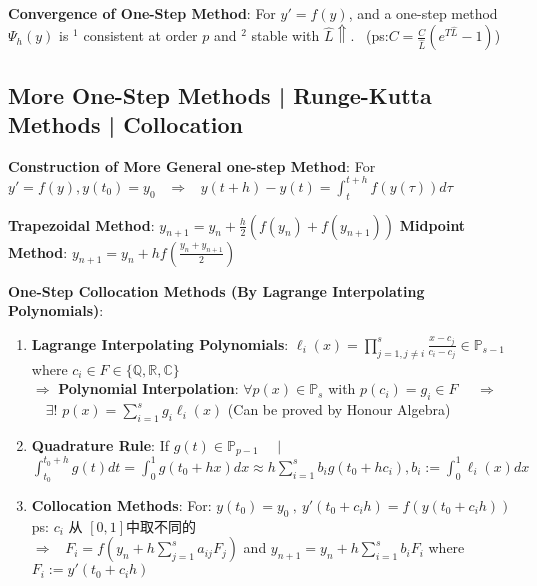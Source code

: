 \documentclass[9pt]{article}
\begin{document}
\vspace{-2pt}
\textbf{Convergence of One-Step Method}: {\small For $y'=f(y)$, and a one-step method $\Psi_h(y)$ is $^1$ consistent at order $p$ and $^2$ stable with $\widehat{L}\Uparrow$.} \ {\tiny (ps:$C=\frac{C}{\widehat{L}}(e^{T\widehat{L}}-1)$)}


\subsection{More One-Step Methods | Runge-Kutta Methods | Collocation} %

\textbf{Construction of More General one-step Method}: For $y'=f(y),y(t_0)=y_0$ \ $\Rightarrow$ \ $y(t+h)-y(t)=\int^{t+h}_tf(y(\tau))d\tau$

\textbf{Trapezoidal Method}: $y_{n+1}=y_n+\frac{h}{2}(f(y_n)+f(y_{n+1}))$ \quad \quad \textbf{Midpoint Method}: {\small $y_{n+1}=y_n+hf(\frac{y_n+y_{n+1}}{2})$}

\textbf{One-Step Collocation Methods (By Lagrange Interpolating Polynomials)}:

\begin{enumerate}[itemsep=-2pt, topsep=-2pt]
    \item \textbf{Lagrange Interpolating Polynomials}: $\ell_{i}(x)=\prod_{j=1,j\ne i}^{s}\frac{x-c_j}{c_i-c_j}\in\mathbb{P}_{s-1}$ \quad where $c_i\in F\in\{\mathbb{Q},\mathbb{R},\mathbb{C}\}$ \\
    $\Rightarrow$ \textbf{Polynomial Interpolation}: $\forall p(x)\in \mathbb{P}_s$ with $p(c_i)=g_i\in F$ \ \ $\Rightarrow$ \ \ $\exists!$ $p(x)=\sum_{i=1}^{s}g_i\ell_i(x)$ {\tiny (Can be proved by Honour Algebra)}
    \item \textbf{Quadrature Rule}: {\small If $g(t)\in\mathbb{P}_{p-1}$} \ \ $\big|$ \ \ {\small $\int^{t_0+h}_{t_0}g(t)dt=\int^1_0g(t_0+hx)dx\approx h\sum_{i=1}^{s}b_ig(t_0+hc_i),b_i:=\int^1_0\ell_i(x)dx$} 
    \item \textbf{Collocation Methods}: For: $y(t_0)=y_0 \ , \ y'(t_0+c_ih)=f(y(t_0+c_ih))$ {\tiny ps: $c_i$ 从 $[0,1]$中取不同的} \\
    $\Rightarrow$ \ $F_i=f(y_n+h\sum_{j=1}^{s}a_{ij}F_j)$ and $y_{n+1}=y_n+h\sum_{i=1}^{s}b_iF_i$ \hspace{30pt} where $F_i:=y'(t_0+c_ih)$
\end{enumerate}
\end{document}
